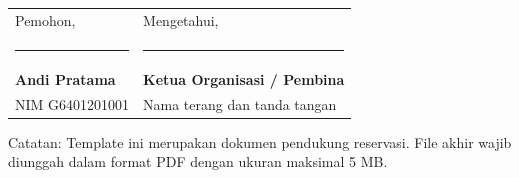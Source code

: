 \documentclass[11pt,a4paper]{article}
\begin{document}
\vspace{16pt}
\begin{tabularx}{\textwidth}{@{}X X@{}}
  \centering Pemohon, & \centering Mengetahui, \tabularnewline[26mm]
  \rule{62mm}{0.4pt} & \rule{62mm}{0.4pt} \tabularnewline
  \centering\textbf{Andi Pratama} & \centering\textbf{Ketua Organisasi / Pembina} \tabularnewline
  \centering NIM G6401201001 & \centering Nama terang dan tanda tangan
\end{tabularx}

\vfill
{\footnotesize\color{TextSecondary}
Catatan: Template ini merupakan dokumen pendukung reservasi. File akhir wajib diunggah dalam format PDF dengan ukuran maksimal 5 MB.
}
\end{document}
